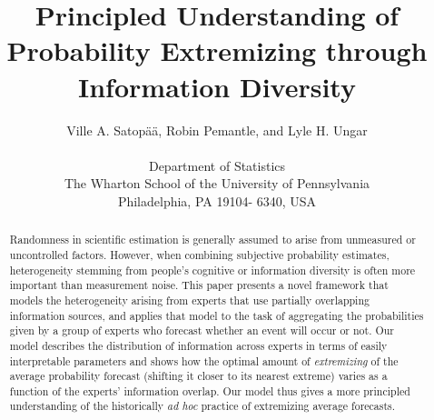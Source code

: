 \documentclass[11pt]{article}
\theoremstyle{definition}
\theoremstyle{definition}
\begin{document}
\title{Principled Understanding of Probability Extremizing through Information Diversity}
\author{
Ville A. Satop\"a\"a, Robin Pemantle, and Lyle H. Ungar\\
\\
 \small Department of Statistics\\
 \small The Wharton School of the University of Pennsylvania\\
 \small Philadelphia, PA 19104- 6340, USA\\ [-0.25in]} \date{}
\maketitle

\pagestyle{myheadings}

\begin{abstract}
Randomness in scientific estimation is generally assumed to arise from
unmeasured or uncontrolled factors. However, when combining subjective probability estimates, heterogeneity
stemming from people's cognitive or information diversity is often
more important than measurement noise.  This paper presents a novel
framework that models the heterogeneity arising
from experts that use partially overlapping information sources, and applies that model to the task of
aggregating the probabilities given by a group of experts who forecast
whether an event will occur or not. Our model describes the
distribution of information across experts in terms of easily
interpretable parameters and shows how the optimal amount
of \textit{extremizing} of the average probability forecast (shifting
it closer to its nearest extreme) varies as a function of the experts'
information overlap.  Our model thus gives a more principled
understanding of the historically {\it ad hoc} practice of extremizing
average forecasts.
\end{abstract}
\end{document}
